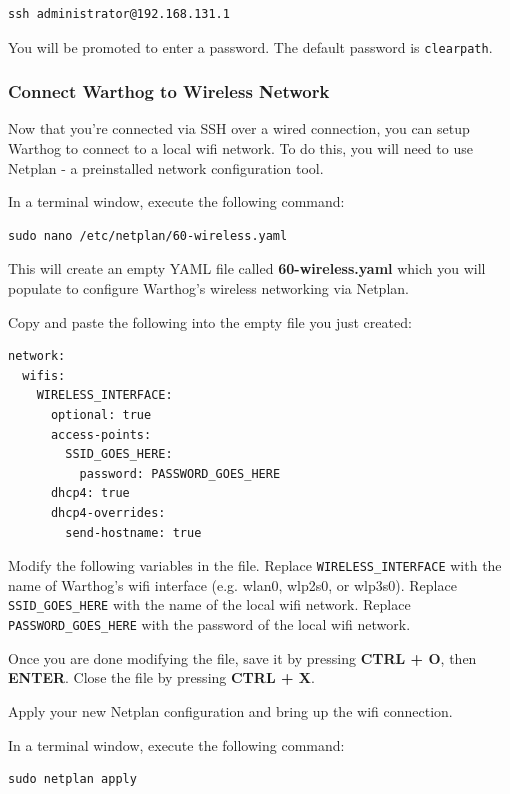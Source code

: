 \documentclass[]{clearpath-latex/clearpath-manual}
\begin{document}
\begin{lstlisting}
ssh administrator@192.168.131.1
\end{lstlisting}

You will be promoted to enter a password.  The default password is \lstinline{clearpath}.

\subsubsection{Connect Warthog to Wireless Network}

Now that you're connected via SSH over a wired connection, you can setup Warthog to connect to a local wifi network. To do this, you will need to use Netplan - a preinstalled network configuration tool.

In a terminal window, execute the following command:

\begin{lstlisting}
sudo nano /etc/netplan/60-wireless.yaml
\end{lstlisting}

This will create an empty YAML file called \textbf{60-wireless.yaml} which you will populate to configure Warthog's wireless networking via Netplan.

Copy and paste the following into the empty file you just created:

\begin{lstlisting}
network:
  wifis:
    WIRELESS_INTERFACE:
      optional: true
      access-points:
        SSID_GOES_HERE:
          password: PASSWORD_GOES_HERE
      dhcp4: true
      dhcp4-overrides:
        send-hostname: true
\end{lstlisting}

Modify the following variables in the file. Replace \lstinline{WIRELESS_INTERFACE} with the name of Warthog's wifi interface (e.g. wlan0, wlp2s0, or wlp3s0). Replace \lstinline{SSID_GOES_HERE} with the name of the local wifi network. Replace \lstinline{PASSWORD_GOES_HERE} with the password of the local wifi network. 

Once you are done modifying the file, save it by pressing \textbf{CTRL + O}, then \textbf{ENTER}. Close the file by pressing \textbf{CTRL + X}.

Apply your new Netplan configuration and bring up the wifi connection.

In a terminal window, execute the following command:

\begin{lstlisting}
sudo netplan apply
\end{lstlisting}
\end{document}
